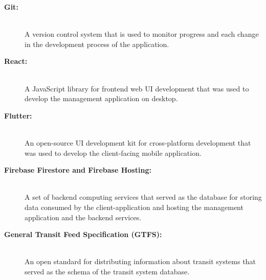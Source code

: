 \documentclass{icsthesis}
\begin{document}
\begin{mainmatter}
\begin{description}
		
			\item[\textbf{Git:}] \hfill \\
				A version control system that is used to monitor progress and each change in the development process of the application.
		
			\item[\textbf{React:}] \hfill \\
				A JavaScript library for frontend web UI development that was used to develop the management application on desktop. 
		
			\item[\textbf{Flutter:}] \hfill \\
				An open-source UI development kit for cross-platform development that was used to develop the client-facing mobile application.
			
		
		
		
		\item[\textbf{Firebase Firestore and Firebase Hosting:}] \hfill \\
			A set of backend computing services that served as the database for storing data consumed by the client-application and hosting the management application and the backend services.
		
			\item[\textbf{General Transit Feed Specification (GTFS):}] \hfill \\
				An open standard for distributing information about transit systems that served as the schema of the transit system database.
			

\end{description}
\end{mainmatter}
\end{document}
